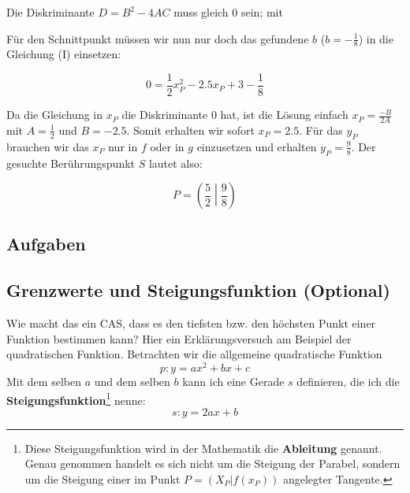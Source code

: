 Die Diskriminante $D=B^2 - 4AC$ muss gleich 0 sein; mit

  
Für den Schnittpunkt müssen wir nun nur doch das gefundene $b$ ($b =
-\frac{1}{8}$) in die Gleichung (I) einsetzen:

$$0 = \frac{1}{2}x_P^2 - 2.5x_P +3 - \frac{1}{8}$$

Da die Gleichung in $x_P$ die Diskriminante 0 hat, ist die Lösung
einfach $x_P = \frac{-B}{2A}$ mit $A = \frac{1}{2}$ und
$B=-2.5$. Somit erhalten wir sofort $x_P = 2.5$. Für das $y_P$
brauchen wir das $x_P$ nur in $f$ oder in $g$ einzusetzen und
erhalten $y_P =\frac{9}{8}$. Der gesuchte Berührungspunkt $S$ lautet
also:

$$P = \left(\frac{5}{2}\middle|\frac{9}{8}\right)$$


\subsection{Aufgaben}
\newpage


\subsection{Grenzwerte und Steigungsfunktion (Optional)}

Wie macht das ein CAS, dass es den tiefsten bzw. den höchsten Punkt
einer Funktion bestimmen kann? Hier ein Erklärungsversuch am Beispiel
der quadratischen Funktion.
Betrachten wir die allgemeine quadratische Funktion $$p: y=ax^2 + bx +
c$$
Mit dem selben $a$ und dem selben $b$ kann ich eine Gerade $s$
definieren, die ich die \textbf{Steigungsfunktion}\footnote{Diese
  Steigungsfunktion wird in der Mathematik die
  \textbf{Ableitung} genannt. Genau genommen handelt
  es sich nicht um die Steigung der Parabel, sondern um die Steigung
  einer im Punkt $P=(X_P|f(x_P))$ angelegter Tangente.} nenne:
$$s: y= 2ax+b$$

